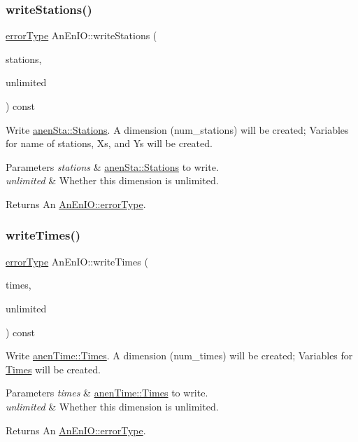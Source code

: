 \subsubsection{\texorpdfstring{write\+Stations()}{writeStations()}}
{\footnotesize\ttfamily \mbox{\hyperlink{class_an_en_i_o_aa56bc1ec6610b86db4349bce20f9ead0}{error\+Type}} An\+En\+I\+O\+::write\+Stations (\begin{DoxyParamCaption}\item[{const \mbox{\hyperlink{classanen_sta_1_1_stations}{anen\+Sta\+::\+Stations}} \&}]{stations,  }\item[{bool}]{unlimited }\end{DoxyParamCaption}) const}

Write \mbox{\hyperlink{classanen_sta_1_1_stations}{anen\+Sta\+::\+Stations}}. A dimension (num\+\_\+stations) will be created; Variables for name of stations, Xs, and Ys will be created. 
\begin{DoxyParams}{Parameters}
{\em stations} & \mbox{\hyperlink{classanen_sta_1_1_stations}{anen\+Sta\+::\+Stations}} to write. \\
\hline
{\em unlimited} & Whether this dimension is unlimited. \\
\hline
\end{DoxyParams}
\begin{DoxyReturn}{Returns}
An \mbox{\hyperlink{class_an_en_i_o_aa56bc1ec6610b86db4349bce20f9ead0}{An\+En\+I\+O\+::error\+Type}}. 
\end{DoxyReturn}
\mbox{\label{class_an_en_i_o_a13ba268b1cae107c145ad8ed895ddedd}} 
\subsubsection{\texorpdfstring{write\+Times()}{writeTimes()}}
{\footnotesize\ttfamily \mbox{\hyperlink{class_an_en_i_o_aa56bc1ec6610b86db4349bce20f9ead0}{error\+Type}} An\+En\+I\+O\+::write\+Times (\begin{DoxyParamCaption}\item[{const \mbox{\hyperlink{classanen_time_1_1_times}{anen\+Time\+::\+Times}} \&}]{times,  }\item[{bool}]{unlimited }\end{DoxyParamCaption}) const}

Write \mbox{\hyperlink{classanen_time_1_1_times}{anen\+Time\+::\+Times}}. A dimension (num\+\_\+times) will be created; Variables for \mbox{\hyperlink{class_times}{Times}} will be created. 
\begin{DoxyParams}{Parameters}
{\em times} & \mbox{\hyperlink{classanen_time_1_1_times}{anen\+Time\+::\+Times}} to write. \\
\hline
{\em unlimited} & Whether this dimension is unlimited. \\
\hline
\end{DoxyParams}
\begin{DoxyReturn}{Returns}
An \mbox{\hyperlink{class_an_en_i_o_aa56bc1ec6610b86db4349bce20f9ead0}{An\+En\+I\+O\+::error\+Type}}. 
\end{DoxyReturn}


